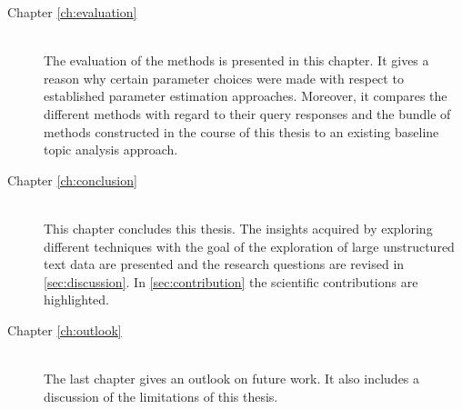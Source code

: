 \begin{description}
    \item[Chapter \ref{ch:evaluation}] \hfill \\
        The evaluation of the methods is presented in this chapter.
        It gives a reason why certain parameter choices were made 
        with respect to established parameter estimation approaches.
        Moreover, it compares the different methods with regard to their query responses 
        and the bundle of methods constructed in the course of this thesis to an existing baseline topic analysis approach.

    \item[Chapter \ref{ch:conclusion}] \hfill \\
        This chapter concludes this thesis.
        The insights acquired by exploring different techniques with the goal of the exploration of large unstructured text data 
        are presented and the research questions are revised in \autoref{sec:discussion}.
        In \autoref{sec:contribution} the scientific contributions are highlighted.

    \item[Chapter \ref{ch:outlook}] \hfill \\
        The last chapter gives an outlook on future work.
        It also includes a discussion of the limitations of this thesis.

\end{description}